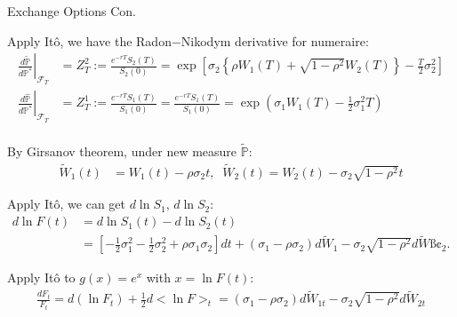 \documentclass{beamer}
\begin{document}
\begin{frame}{Exchange Options Con.}

    {\footnotesize \footnotesize
    \par Apply Itô, we have the Radon$-$Nikodym derivative for numeraire:
    \begin{align*}
        \left.\frac{d\tilde{\mathbb{P}}}{d\mathbb{P}^*}\right|_{\mathcal{F}_T}& = Z_T^2 := \frac{e^{-rT} S_2(T)}{S_2(0)} = \exp \left[ \sigma_2 
        \left\{ \rho W_1(T) + \sqrt{1 - \rho^2} W_2(T) \right\} - \frac{T}{2} \sigma_2^2 \right]\\
        \left.\frac{d\hat{\mathbb{P}}}{d\mathbb{P}^*}\right|_{\mathcal{F}_T}& = Z_T^1 := \frac{e^{-rT} S_1(T)}{S_1(0)} 
        =\frac{e^{-rT}S_1(T)}{S_1(0)} = \exp\left(\sigma_1 W_1(T) - \frac{1}{2}\sigma_1^2 T\right)\\
    \end{align*}

    \vspace{-2em}
    \par By Girsanov theorem, under new measure $\tilde{\mathbb{P}}$:
    \begin{align*}
        \tilde{W}_1(t) &= W_1(t) - \rho\sigma_2 t, \;\; \tilde{W}_2(t) = W_2(t) - \sigma_2\sqrt{1-\rho^2} t
    \end{align*}
    \par Apply Itô, we can get $d\ln S_1$, $d\ln S_2$:
    \begin{align*}
        d \ln F(t) &= d \ln S_1(t) - d \ln S_2(t) \\
        &= \left[  - \tfrac{1}{2}\sigma_1^2  - \tfrac{1}{2}\sigma_2^2 + \rho \sigma_1 \sigma_2 \right] dt 
        + (\sigma_1 - \rho \sigma_2) d\tilde{W}_1 - \sigma_2 \sqrt{1-\rho^2} d\tilde{W}ß¢_2.
    \end{align*}
    \par Apply Itô to $g(x) = e^x$ with $x = \ln F(t)$:
    \begin{align*}
        \frac{dF_t}{F_t} = d(\ln F_t) + \frac{1}{2} d<\ln F>_t 
        = (\sigma_1 - \rho\sigma_2) d\tilde{W}_{1t} - \sigma_2 \sqrt{1 - \rho^2} d\tilde{W}_{2t}
    \end{align*}
    }
\end{frame}
\end{document}
